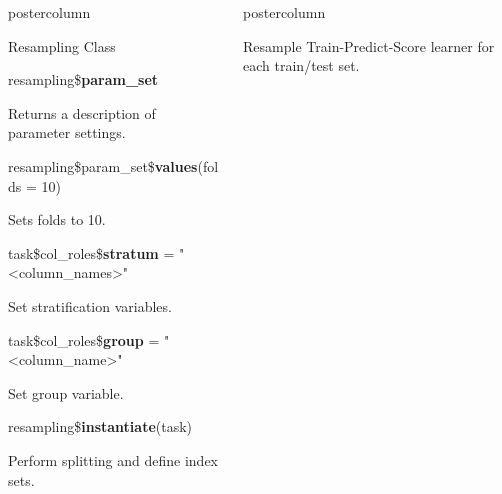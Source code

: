 \documentclass{beamer}
\newlength{\columnheight} %
\newcommand{\codeinline}[1]{\begin{codeboxinline}#1\end{codeboxinline}}
\begin{document}
\begin{withoutheader}
\begin{frame}[fragile]{}
\begin{columns}
\begin{column}{.245\textwidth}
\begin{beamercolorbox}[center]{postercolumn}
\begin{minipage}{.98\textwidth}
{\begin{myblock}{Resampling Class}
							\vspace{1em}
							\begin{codebox}
								resampling\$\textbf{param\_set}
							\end{codebox}
							Returns a description of parameter settings.
							\\
							\begin{codebox}
								resampling\$param\_set\$\textbf{values}(folds = 10)
							\end{codebox}
							Sets folds to 10.
							\\
							\begin{codebox}
								task\$col\_roles\$\textbf{stratum} = "<column\_names>"
							\end{codebox}
							Set stratification variables.
							\\
							\begin{codebox}
								task\$col\_roles\$\textbf{group} = "<column\_name>"
							\end{codebox}
							Set group variable.
							\\
							\begin{codebox}
								resampling\$\textbf{instantiate}(task)
							\end{codebox}
                            Perform splitting and define index sets.
							\\
						\end{myblock}
						\vfill
					}
				\end{minipage}
			\end{beamercolorbox}
		\end{column}
		\begin{column}{.245\textwidth}
			\begin{beamercolorbox}[center]{postercolumn}
				\begin{minipage}{.98\textwidth}
					\parbox[t][\columnheight]{\textwidth}{
						\begin{myblock}{Resample}
                            Train-Predict-Score learner for each train/test set.
							\\

\end{myblock}}
\end{minipage}
\end{beamercolorbox}
\end{column}
\end{columns}
\end{frame}
\end{withoutheader}
\end{document}
